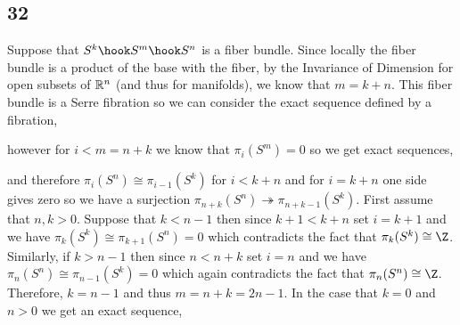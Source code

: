 \documentclass[12pt]{extarticle}
\begin{document}
\subsection{32}


Suppose that $S^k \hook S^m \hook S^n$ is a fiber bundle. Since locally the fiber bundle is a product of the base with the fiber, by the Invariance of Dimension for open subsets of $\mathbb{R}^n$ (and thus for manifolds), we know that $m = k + n$. This fiber bundle is a Serre fibration so we can consider the exact sequence defined by a fibration,

\begin{center}
\end{center}
however for $i < m = n + k$ we know that $\pi_i(S^m) = 0$ so we get exact sequences,
\begin{center}
\end{center}
and therefore $\pi_i(S^n) \cong \pi_{i-1}(S^k)$ for $ i < k + n$ and for $i = k + n$ one side gives zero so we have a surjection $\pi_{n + k}(S^n) \twoheadrightarrow \pi_{n + k -1}(S^k)$. First assume that $n, k > 0$. Suppose that $k < n - 1$ then since $k + 1 < k + n$ set $i = k + 1$ and we have $\pi_{k}(S^k) \cong \pi_{k+1}(S^n) = 0$ which contradicts the fact that $\pi_k(S^k) \cong \Z$. Similarly, if $k > n - 1$ then since $n < n + k$ set $i = n$ and we have $\pi_n(S^n) \cong \pi_{n - 1}(S^k) = 0$ which again contradicts the fact that $\pi_n(S^n) \cong \Z$. Therefore, $k = n - 1$ and thus $m = n + k = 2 n - 1$. In the case that $k = 0$ and $n > 0$ we get an exact sequence,
\begin{center}
\end{center}
\end{document}
